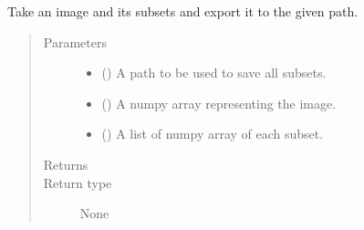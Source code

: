 \documentclass[letterpaper,10pt,english]{sphinxmanual}
\begin{document}
\begin{fulllineitems}
\label{\detokenize{api:readpyne.io.cutout_save}}
Take an image and its subsets and export it to the given path.
\begin{quote}\begin{description}
\item[{Parameters}] \leavevmode\begin{itemize}
\item {} 
 () \textendash{} A path to be used to save all subsets.

\item {} 
 () \textendash{} A numpy array representing the image.

\item {} 
 () \textendash{} A list of numpy array of each subset.

\end{itemize}

\item[{Returns}] \leavevmode


\item[{Return type}] \leavevmode
None

\end{description}\end{quote}

\end{fulllineitems}

\end{document}
